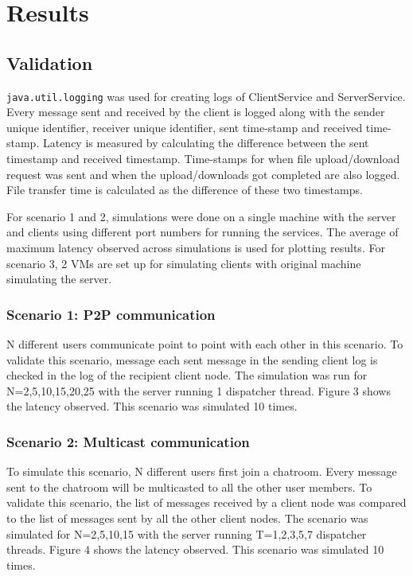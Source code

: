 \documentclass[a4paper,10pt]{article}
\begin{document}
\section{Results}
\subsection{Validation}
\texttt{java.util.logging} was used for creating logs of ClientService and ServerService. Every message sent and received by the client is logged along with the sender unique identifier, receiver unique identifier, sent time-stamp and received time-stamp. Latency is measured by calculating the difference between the sent timestamp and received timestamp. Time-stamps for when file upload/download request was sent and when the upload/downloads got completed are also logged. File transfer time is calculated as the difference of these two timestamps. \par For scenario 1 and 2, simulations were done on a single machine with the server and clients using different port numbers for running the services. The average of maximum latency observed across simulations is used for plotting results. For scenario 3, 2 VMs are set up for simulating clients with original machine simulating the server. 

\subsubsection{Scenario 1: P2P communication}
N different users communicate point to point with each other in this scenario. To validate this scenario, message each sent message in the sending client log is checked in the log of the recipient client node.
The simulation was run for N=2,5,10,15,20,25 with the server running 1 dispatcher thread. Figure 3 shows the latency observed. This scenario was simulated 10 times.

\subsubsection{Scenario 2: Multicast communication}
To simulate this scenario, N different users first join a chatroom. Every message sent to the chatroom will be multicasted to all the other user members. To validate this scenario, the list of messages received by a client node was compared to the list of messages sent by all the other client nodes. The scenario was simulated for N=2,5,10,15 with the server running T=1,2,3,5,7 dispatcher threads. Figure 4 shows the latency observed. This scenario was simulated 10 times.
\end{document}
